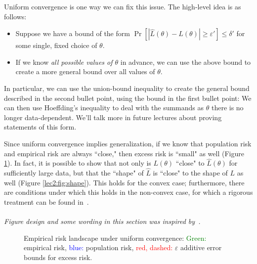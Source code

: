 
Uniform convergence is one way we can fix this issue. The high-level idea is as follows: 
\begin{itemize}
    \item Suppose we have a bound of the form $\Pr[|\hat{L}(\theta) - L(\theta)| \geq \varepsilon'] \leq \delta'$ for some single, fixed choice of $\theta$.
    \item If we know \emph{all possible values of $\theta$} in advance, we can use the above bound to create a more general bound over all values of $\theta$.
\end{itemize}
In particular, we can use the union-bound inequality to create the general bound described in the second bullet point, using the bound in the first bullet point:
We can then use Hoeffding's inequality to deal with the summands as $\theta$ there is no longer data-dependent. We'll talk more in future lectures about proving statements of this form.


Since uniform convergence implies generalization, if we know that population risk and empirical risk are always ``close," then excess risk is ``small" as well (Figure \ref{lec2:fig:uc}). In fact, it is possible to show that not only is $L(\theta)$ ``close" to $\hat{L}(\theta)$ for sufficiently large data, but that the ``shape" of $\hat{L}$ is ``close" to the shape of $L$ as well (Figure \ref{lec2:fig:shape}). This holds for the convex case; furthermore, there are conditions under which this holds in the non-convex case, for which a rigorous treatment can be found in~\cite{mei2017landscape}.\\\\
\emph{Figure design and some wording in this section was inspired by~\cite{percynotes, thomasliu2018}.}

\begin{figure}[t]
    \centering
    \caption{Empirical risk landscape under uniform convergence: \textcolor{green}{Green:} empirical risk, \textcolor{blue}{blue:} population risk, \textcolor{red}{red, dashed:} $\varepsilon$ additive error bounds for excess risk.}
    \label{lec2:fig:uc}
\end{figure}

